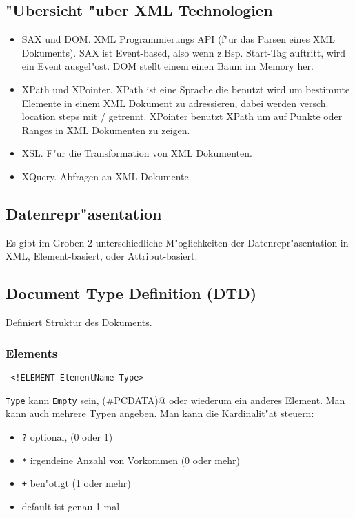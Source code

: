 \documentclass[german, 10pt, a4paper, twocolumn]{scrartcl}
\theoremstyle{definition}
\theoremstyle{remark}
\theoremstyle{example}
\begin{document}
\subsection{"Ubersicht "uber XML Technologien}

\begin{itemize}
	\item SAX und DOM. XML Programmierungs API (f"ur das Parsen eines XML Dokuments). SAX ist Event-based, also wenn z.Bsp. Start-Tag auftritt, wird ein Event ausgel"ost. DOM stellt einem einen Baum im Memory her.
	\item XPath und XPointer. XPath ist eine Sprache die benutzt wird um bestimmte Elemente in einem XML Dokument zu adressieren, dabei werden versch. location steps mit / getrennt. XPointer benutzt XPath um auf Punkte oder Ranges in XML Dokumenten zu zeigen.
	\item XSL. F"ur die Transformation von XML Dokumenten.
	\item XQuery. Abfragen an XML Dokumente.
\end{itemize}

\subsection{Datenrepr"asentation}

Es gibt im Groben 2 unterschiedliche M"oglichkeiten der Datenrepr"asentation in XML, Element-basiert, oder Attribut-basiert.

\subsection{Document Type Definition (DTD)}

Definiert Struktur des Dokuments.

\subsubsection{Elements}

\begin{verbatim}
 <!ELEMENT ElementName Type>
\end{verbatim}

\verb#Type# kann \verb#Empty# sein, \verb@(#PCDATA)@ oder wiederum ein anderes Element. Man kann auch mehrere Typen angeben. Man kann die Kardinalit"at steuern:
\begin{itemize}
	\item \verb#?# optional, (0 oder 1)
	\item \verb#*# irgendeine Anzahl von Vorkommen (0 oder mehr)
	\item \verb#+# ben"otigt (1 oder mehr)
	\item default ist genau 1 mal
\end{itemize}
\end{document}
